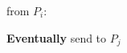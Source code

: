 \begin{bbox}[title={\textbf{Functionality} $\F_\msf{Async} (P_i, P_j)$}]

\OnInput {} from $P_i$:
	
	\begin{renumerate}

		\item {\bf Eventually} send  to $P_j$

	\end{renumerate}
	
\end{bbox}
